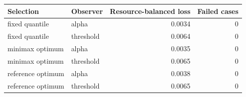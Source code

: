 \begin{center}\begin{tabular}{llrr}\toprule
Selection & Observer & Resource-balanced loss & Failed cases\\\midrule
fixed quantile & alpha & 0.0034 & 0\\
fixed quantile & threshold & 0.0064 & 0\\
minimax optimum & alpha & 0.0035 & 0\\
minimax optimum & threshold & 0.0065 & 0\\
reference optimum & alpha & 0.0038 & 0\\
reference optimum & threshold & 0.0065 & 0\\
\bottomrule\end{tabular}\end{center}
